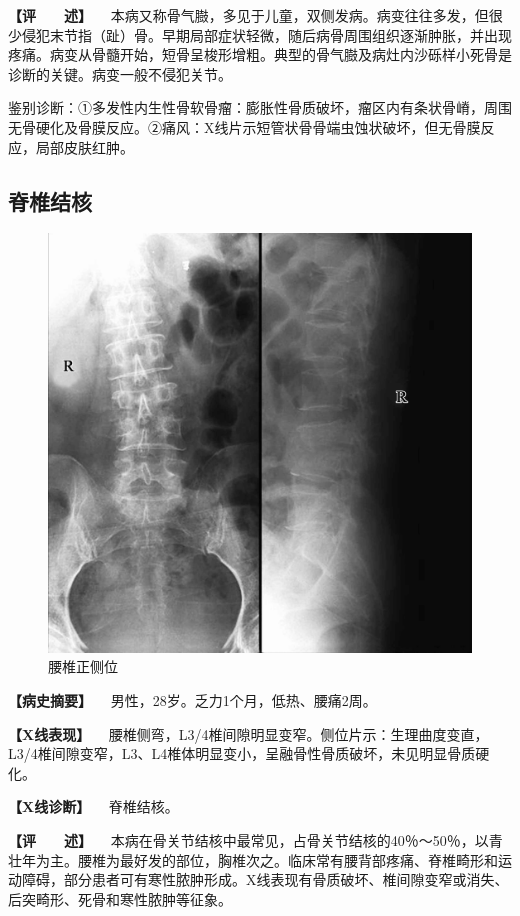 \textbf{【评　　述】}
　本病又称骨气臌，多见于儿童，双侧发病。病变往往多发，但很少侵犯末节指（趾）骨。早期局部症状轻微，随后病骨周围组织逐渐肿胀，并出现疼痛。病变从骨髓开始，短骨呈梭形增粗。典型的骨气臌及病灶内沙砾样小死骨是诊断的关键。病变一般不侵犯关节。

鉴别诊断：①多发性内生性骨软骨瘤：膨胀性骨质破坏，瘤区内有条状骨嵴，周围无骨硬化及骨膜反应。②痛风：X线片示短管状骨骨端虫蚀状破坏，但无骨膜反应，局部皮肤红肿。

\subsection{脊椎结核}

\begin{figure}[!htbp]
 \centering
 \includegraphics{./images/Image00079.jpg}
 \captionsetup{justification=centering}
 \caption{腰椎正侧位}
 \label{fig2-6-4}
  \end{figure} 

\textbf{【病史摘要】} 　男性，28岁。乏力1个月，低热、腰痛2周。

\textbf{【X线表现】}
　腰椎侧弯，L3/4椎间隙明显变窄。侧位片示：生理曲度变直，L3/4椎间隙变窄，L3、L4椎体明显变小，呈融骨性骨质破坏，未见明显骨质硬化。

\textbf{【X线诊断】} 　脊椎结核。

\textbf{【评　　述】}
　本病在骨关节结核中最常见，占骨关节结核的40％～50％，以青壮年为主。腰椎为最好发的部位，胸椎次之。临床常有腰背部疼痛、脊椎畸形和运动障碍，部分患者可有寒性脓肿形成。X线表现有骨质破坏、椎间隙变窄或消失、后突畸形、死骨和寒性脓肿等征象。

